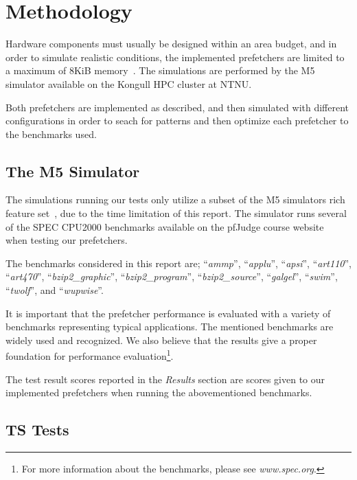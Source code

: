 \section{Methodology}

Hardware components must usually be designed within an area budget, and in order
to simulate realistic conditions, the implemented prefetchers are limited to a
maximum of 8KiB memory~\cite{guidelines}. The simulations are performed by the
M5 simulator available on the Kongull HPC cluster at NTNU.

Both prefetchers are implemented as described, and then simulated with different
configurations in order to seach for patterns and then optimize each prefetcher
to the benchmarks used.

\subsection{The M5 Simulator}

The simulations running our tests only utilize a subset of the M5 simulators
rich feature set~\cite{user_doc}, due to the time limitation of this report. The
simulator runs several of the SPEC CPU2000 benchmarks available on the pfJudge
course website~\cite{guidelines} when testing our prefetchers.

The benchmarks considered in this report are; ``\emph{ammp}'', ``\emph{applu}'',
``\emph{apsi}'', ``\emph{art110}'', ``\emph{art470}'',
``\emph{bzip2\_graphic}'', ``\emph{bzip2\_program}'', ``\emph{bzip2\_source}'',
``\emph{galgel}'', ``\emph{swim}'', ``\emph{twolf}'', and ``\emph{wupwise}''.

It is important that the prefetcher performance is evaluated with a variety of
benchmarks representing typical applications. The mentioned benchmarks are
widely used and recognized. We also believe that the results give a proper
foundation for performance evaluation\footnote{For more information about the
benchmarks, please see \emph{www.spec.org}.}.

The test result scores reported in the \textit{Results} section are scores given
to our implemented prefetchers when running the abovementioned benchmarks.


\subsection{TS Tests}

